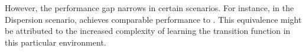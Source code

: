 However, the performance gap narrows in certain scenarios. For instance, in the Dispersion scenario, \fnamer{} achieves comparable performance to \fname{}. This equivalence might be attributed to the increased complexity of learning the transition function in this particular environment.
